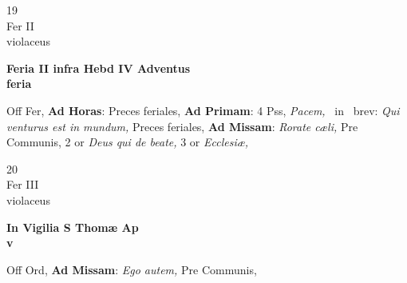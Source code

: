 \documentclass[10pt, openany]{book}
\begin{document}
        \begin{center}
            \begin{minipage}{3.5in}
                \vspace{2em}
                \begin{minipage}{0.5in}
                    {\Huge 19} \\
                    {\normalsize Fer II} \\
                    {\normalsize violaceus}
                \end{minipage}
                \begin{minipage}{3.0in}
                    \textbf{ \large Feria II infra Hebd IV Adventus \\
                    \textnormal{\normalsize feria}} \\ 
                \end{minipage}
                \begin{justify}Off Fer, \textbf{Ad Horas}: Preces feriales, \textbf{Ad Primam}: 4 Pss, \textit{Pacem,} \Vbar\ in \Rbar\ brev: \textit{Qui venturus est in mundum,} Preces feriales, \textbf{Ad Missam}: \textit{Rorate cæli,} Pre Communis, 2 or \textit{Deus qui de beate,} 3 or \textit{Ecclesiæ,}   
                \end{justify}
            \end{minipage}
        \end{center}
    
        \begin{center}
            \begin{minipage}{3.5in}
                \vspace{2em}
                \begin{minipage}{0.5in}
                    {\Huge 20} \\
                    {\normalsize Fer III} \\
                    {\normalsize violaceus}
                \end{minipage}
                \begin{minipage}{3.0in}
                    \textbf{ \large In Vigilia S Thomæ Ap \\
                    \textnormal{\normalsize v}} \\ 
                \end{minipage}
                \begin{justify}Off Ord, \textbf{Ad Missam}: \textit{Ego autem,} Pre Communis,   
                \end{justify}
            \end{minipage}
        \end{center}
    
\end{document}
